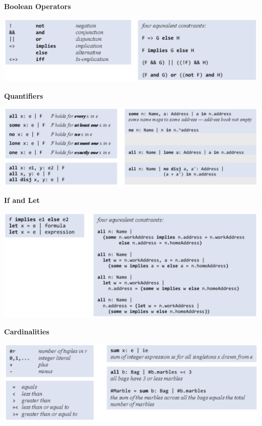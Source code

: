 \vspace{-8pt}
\textbf{Boolean Operators}
\begin{center}
	\includegraphics[width=\columnwidth]{assets/boolean}
\end{center}

\vspace{-8pt}
\textbf{Quantifiers}
\begin{center}
	\includegraphics[width=\columnwidth]{assets/quantifiers}
\end{center}

\vspace{-4pt}
\textbf{If and Let}
\begin{center}
	\includegraphics[width=\columnwidth]{assets/if}
\end{center}

\textbf{Cardinalities}
\begin{center}
	\includegraphics[width=\columnwidth]{assets/cardinalities}
\end{center}



